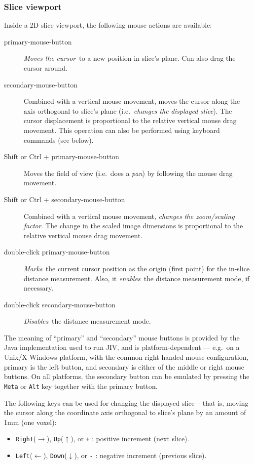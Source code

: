 \subsubsection{Slice viewport}
\label{sec:gui:slice-viewport}

Inside a 2D slice viewport, the following mouse actions are available:
\begin{description}
\item[primary-mouse-button] {\em Moves the cursor}\ to a new position
  in slice's plane. Can also drag the cursor around.
\item[secondary-mouse-button] Combined with a vertical mouse movement,
  moves the cursor along the axis orthogonal to slice's plane
  (i.e.\ {\em changes the displayed slice}\/). The cursor displacement
  is proportional to the relative vertical mouse drag movement. This
  operation can also be performed using keyboard commands (see below).
\item[Shift or Ctrl + primary-mouse-button] Moves the field of view
  (i.e.\ does a {\em pan}\/) by following the mouse drag movement.
\item[Shift or Ctrl + secondary-mouse-button] Combined with a vertical
  mouse movement, {\em changes the zoom/scaling factor}.  The change
  in the scaled image dimensions is proportional to the relative
  vertical mouse drag movement.
\item[double-click primary-mouse-button] {\em Marks}\ the current
  cursor position as the origin (first point) for the in-slice
  distance measurement. Also, it {\em enables}\ the distance measurement
  mode, if necessary.
\item[double-click secondary-mouse-button] {\em Disables}\ the distance
  measurement mode.
\end{description}
The meaning of ``primary'' and ``secondary'' mouse buttons is provided
by the Java implementation used to run JIV, and is platform-dependent
--- e.g.\ on a Unix/X-Windows platform, with the common right-handed
mouse configuration, primary is the left button, and secondary is
either of the middle or right mouse buttons.  On all platforms, the
secondary button can be emulated by pressing the \verb+Meta+ or
\verb+Alt+ key together with the primary button.

The following keys can be used for changing the displayed slice --
that is, moving the cursor along the coordinate axis orthogonal to
slice's plane by an amount of 1mm (one voxel):
\begin{itemize}
\item \verb+Right+($\rightarrow$), \verb+Up+($\uparrow$), or \verb|+|
  : positive increment (next slice).
\item \verb+Left+($\leftarrow$), \verb+Down+($\downarrow$), or
  \verb|-| : negative increment (previous slice).
\end{itemize}

